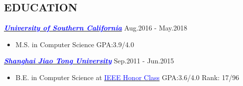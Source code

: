 \documentclass[line,margin]{res}
\begin{document}
\address{Address: \#1247, West 30th St, Los Angeles, CA, 90007 \quad \quad Email: \href{mailto:xiangchz@usc.edu}{\textcolor{blue}{xiangchz@usc.edu}}}
\address{\hspace{33mm} Phone: 310-592-6219  \quad \quad Github: \href{https://github.com/fairy-tale}{\textcolor{blue}{https://github.com/fairy-tale}}}

\begin{resume}
\vspace{-2mm}
\vspace{-1.5mm}
\section{EDUCATION}
                {\sl \href{http://www.usc.edu/}{\textcolor{blue}{\textbf{University of Southern California}}}}  \hfill Aug.2016 - May.2018
                    \begin{itemize}
                    \item M.S. in Computer Science \quad GPA:3.9/4.0
                    \end{itemize}
                \vspace{-2mm}
                {\sl \href{http://en.sjtu.edu.cn/}{\textcolor{blue}{\textbf{Shanghai Jiao Tong University}}}}  \hfill Sep.2011 - Jun.2015
                 \begin{itemize}
                   \item B.E. in Computer Science at \href{http://english.seiee.sjtu.edu.cn/english/info/8338.htm}{\textcolor{blue}{IEEE Honor Class}} \quad GPA:3.6/4.0 \quad Rank: 17/96
                 \end{itemize}

\vspace{-2.5mm}

\end{resume}
\end{document}
